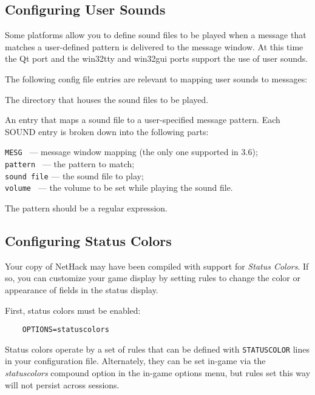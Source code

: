 \subsection*{Configuring User Sounds}

Some platforms allow you to define sound files to be played when a message 
that matches a user-defined pattern is delivered to the message window.
At this time the Qt port and the win32tty and win32gui ports support the
use of user sounds.

The following config file entries are relevant to mapping user sounds
to messages:

\blist{}
\item[\ib{SOUNDDIR}]
The directory that houses the sound files to be played.
\item[\ib{SOUND}]
An entry that maps a sound file to a user-specified message pattern.
Each SOUND entry is broken down into the following parts:

{\tt MESG      } --- message window mapping (the only one supported in 3.6);\\
{\tt pattern   } --- the pattern to match;\\
{\tt sound file} --- the sound file to play;\\
{\tt volume    } --- the volume to be set while playing the sound file.
\elist

The pattern should be a regular expression.

\subsection*{Configuring Status Colors}

Your copy of NetHack may have been compiled with support for
{\it Status Colors}.  If so, you can customize your game display by
setting rules to change the color or appearance of fields in the status
display.

First, status colors must be enabled:

\begin{verbatim}
    OPTIONS=statuscolors
\end{verbatim}

Status colors operate by a set of rules that can be defined with
{\tt STATUSCOLOR\/} lines in your configuration file.  Alternately, they
can be set in-game via the {\it statuscolors\/} compound option in the
in-game options menu, but rules set this way will not persist across
sessions.

